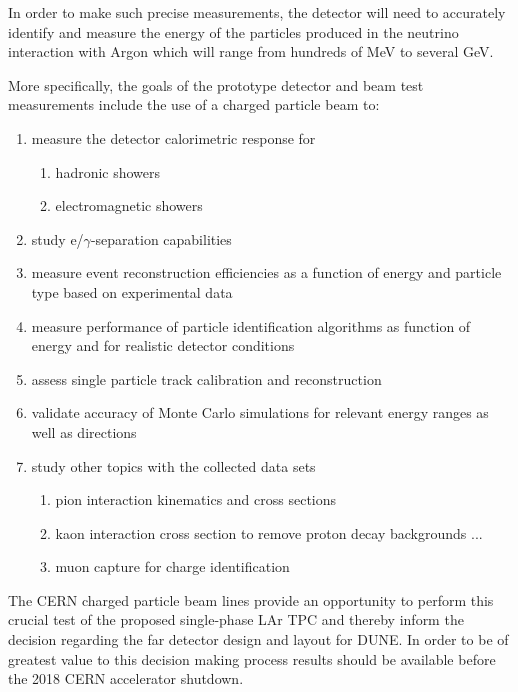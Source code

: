 In order to make such precise measurements, the detector will need to accurately identify and measure the energy of the particles produced in the neutrino interaction with Argon which will range from hundreds of MeV to several GeV.



More specifically, the goals of the prototype detector and beam test measurements include the use of a charged particle beam to:
\begin{enumerate}
\item measure the detector calorimetric response for
\begin{enumerate}
	\item hadronic showers
	\item electromagnetic showers
\end{enumerate}
\item study e/$\gamma$-separation capabilities
\item measure event reconstruction efficiencies as a function of energy and particle type based on experimental data
\item measure performance of particle identification algorithms as function of energy and for realistic detector conditions
\item assess single particle track calibration and reconstruction
\item validate accuracy of Monte Carlo simulations for relevant energy ranges as well as directions

\item study other topics with the collected data sets
 \begin{enumerate}
    \item pion interaction kinematics and cross sections
    \item kaon interaction cross section to remove proton decay backgrounds ...
    \item muon capture for charge identification
 \end{enumerate}
\end{enumerate}

The CERN charged particle beam lines provide an opportunity to perform this crucial test of the 
proposed single-phase LAr TPC and thereby inform the decision regarding the far detector design and layout for DUNE.
In order to be of greatest value to this decision making process results should be available before the 2018 CERN accelerator shutdown.


